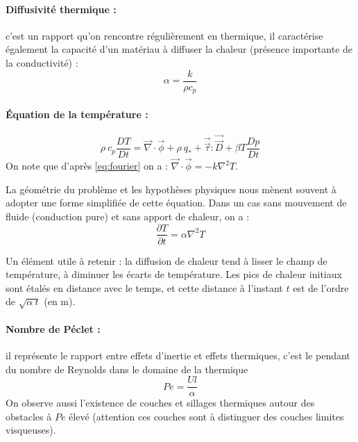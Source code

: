 \paragraph{Diffusivité thermique :}c'est un rapport qu'on rencontre régulièrement en thermique, il caractérise également la capacité d'un matériau à diffuser la chaleur (présence importante de la conductivité) :
%
\begin{equation}
    \alpha = \frac{k}{\rho c_p}
\end{equation}


\paragraph{Équation de la température :}
%
\begin{equation}
    \rho~c_p \frac{DT}{Dt}
    = \vec{\nabla} \cdot \vec{\phi} %
    + \rho~q_*
    + \vec{\vec{\tau}} : \vec{\vec{D}}
    + \beta T\frac{Dp}{Dt}
\end{equation}
%
On note que d'après \eqref{eq:fourier} on a : $\vec{\nabla} \cdot \vec{\phi} = - k \nabla^2 T$.

La géométrie du problème et les hypothèses physiques nous mènent souvent à adopter une forme simplifiée de cette équation. Dans un cas sans mouvement de fluide (conduction pure) et sans apport de chaleur, on a :
%
\begin{equation}
    \frac{\partial T}{\partial t}
    = \alpha \nabla^2 T
\end{equation}

Un élément utile à retenir : la diffusion de chaleur tend à lisser le champ de température, à diminuer les écarts de température. Les pics de chaleur initiaux sont étalés en distance avec le temps, et cette distance à l'instant $t$ est de l'ordre de $\sqrt{\alpha~t}$ (en m).


\paragraph{Nombre de Péclet :}il représente le rapport entre effets d'inertie et effets thermiques, c'est le pendant du nombre de Reynolds dans le domaine de la thermique
%
\begin{equation}
    Pe = \frac{Ul}{\alpha}
\end{equation}
%
On observe aussi l'existence de couches et sillages thermiques autour des obstacles à $Pe$ élevé (attention ces couches sont à distinguer des couches limites visqueuses).

